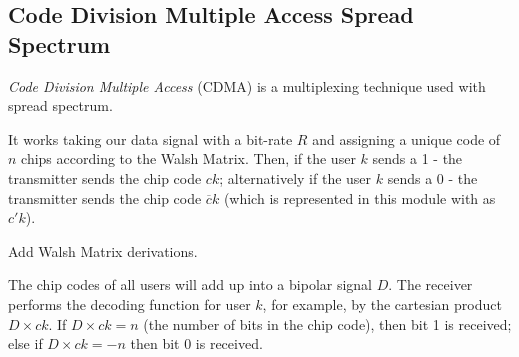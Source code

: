     
    



\subsection{Code Division Multiple Access Spread Spectrum}
\textit{Code Division Multiple Access} (CDMA) is a multiplexing technique used with spread spectrum.

It works taking our data signal with a bit-rate $R$ and assigning a unique code of $n$ chips according to the Walsh Matrix. Then, if the user $k$ sends a 1 - the transmitter sends the chip code $ck$; alternatively if the user $k$ sends a 0 - the transmitter sends the chip code $\overline{c}k$ (which is represented in this module with as $c'k$). 

\begin{todo}
Add Walsh Matrix derivations.
\end{todo}

The chip codes of all users will add up into a bipolar signal $D$. The receiver performs the decoding function for user $k$, for example, by the cartesian product $D\times ck$. If $D\times ck = n$ (the number of bits in the chip code), then bit 1 is received; else if $D\times ck=-n$ then bit 0 is received.

